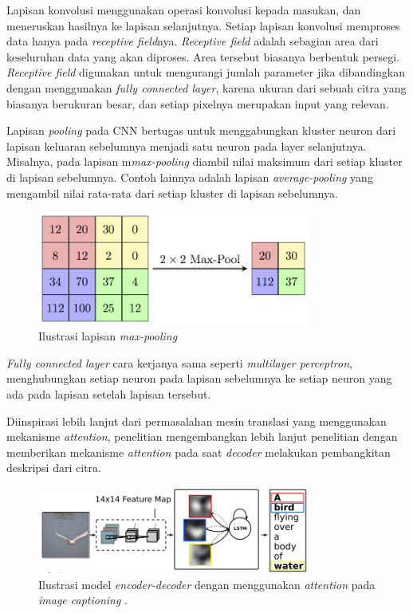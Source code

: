 Lapisan konvolusi menggunakan operasi konvolusi kepada masukan, dan meneruskan hasilnya ke lapisan selanjutnya. Setiap lapisan konvolusi memproses data hanya pada \textit{receptive field}nya. \textit{Receptive field} adalah sebagian area dari keseluruhan data yang akan diproses. Area tersebut biasanya berbentuk persegi. \textit{Receptive field} digunakan untuk mengurangi jumlah parameter jika dibandingkan dengan menggunakan \textit{fully connected layer}, karena ukuran dari sebuah citra yang biasanya berukuran besar, dan setiap pixelnya merupakan input yang relevan.
\bigskip

Lapisan \textit{pooling} pada CNN bertugas untuk menggabungkan kluster neuron dari lapisan keluaran sebelumnya menjadi satu neuron pada layer selanjutnya. Misalnya, pada lapisan m\textit{max-pooling} diambil nilai maksimum dari setiap kluster di lapisan sebelumnya. Contoh lainnya adalah lapisan \textit{average-pooling} yang mengambil nilai rata-rata dari setiap kluster di lapisan sebelumnya.

\begin{figure}[h]
    \centering
    \includegraphics[width=0.8\textwidth]{resources/images/max-pooling.png}
    \caption{Ilustrasi lapisan \textit{max-pooling}}
    \label{fig:max-pooling}
\end{figure}

\textit{Fully connected layer} cara kerjanya sama seperti \textit{multilayer perceptron}, menghubungkan setiap neuron pada lapisan sebelumnya ke setiap neuron yang ada pada lapisan setelah lapisan tersebut.
\bigskip

Diinspirasi lebih lanjut dari permasalahan mesin translasi yang menggunakan mekanisme \textit{attention}, penelitian \textcite{Xu2015} mengembangkan lebih lanjut penelitian \textcite{Vinyals2014} dengan memberikan mekanisme \textit{attention} pada saat \textit{decoder} melakukan pembangkitan deskripsi dari citra.

\begin{figure}[h]
    \centering
    \includegraphics[width=0.8\textwidth]{resources/images/image-captioning-encoder-decoder.png}
    \caption{Ilustrasi model \textit{encoder-decoder} dengan menggunakan \textit{attention} pada \textit{image captioning} \parencite{Xu2015}.}
    \label{fig:image-captioning-encoder-decoder}
\end{figure}


